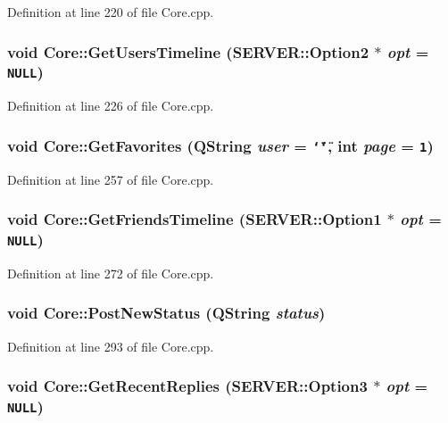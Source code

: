 Definition at line 220 of file Core.cpp.\hypertarget{classCore_7308eb02f04bd6da071db62f291c9def}{
\subsubsection{\setlength{\rightskip}{0pt plus 5cm}void Core::GetUsersTimeline ({\bf SERVER::Option2} $\ast$ {\em opt} = {\tt NULL})}}
\label{classCore_7308eb02f04bd6da071db62f291c9def}




Definition at line 226 of file Core.cpp.\hypertarget{classCore_a896aea28b564e4841df4cf527fb0247}{
\subsubsection{\setlength{\rightskip}{0pt plus 5cm}void Core::GetFavorites (QString {\em user} = {\tt \char`\"{}\char`\"{}}, \/  int {\em page} = {\tt 1})}}
\label{classCore_a896aea28b564e4841df4cf527fb0247}




Definition at line 257 of file Core.cpp.\hypertarget{classCore_bc64aa3de63d39a878db543d8d5df9f5}{
\subsubsection{\setlength{\rightskip}{0pt plus 5cm}void Core::GetFriendsTimeline ({\bf SERVER::Option1} $\ast$ {\em opt} = {\tt NULL})}}
\label{classCore_bc64aa3de63d39a878db543d8d5df9f5}




Definition at line 272 of file Core.cpp.\hypertarget{classCore_7023af805b629e90a7aa2978366ee344}{
\subsubsection{\setlength{\rightskip}{0pt plus 5cm}void Core::PostNewStatus (QString {\em status})}}
\label{classCore_7023af805b629e90a7aa2978366ee344}




Definition at line 293 of file Core.cpp.\hypertarget{classCore_b95dc3fca63c84496f6a487d845e7ba9}{
\subsubsection{\setlength{\rightskip}{0pt plus 5cm}void Core::GetRecentReplies ({\bf SERVER::Option3} $\ast$ {\em opt} = {\tt NULL})}}
\label{classCore_b95dc3fca63c84496f6a487d845e7ba9}




